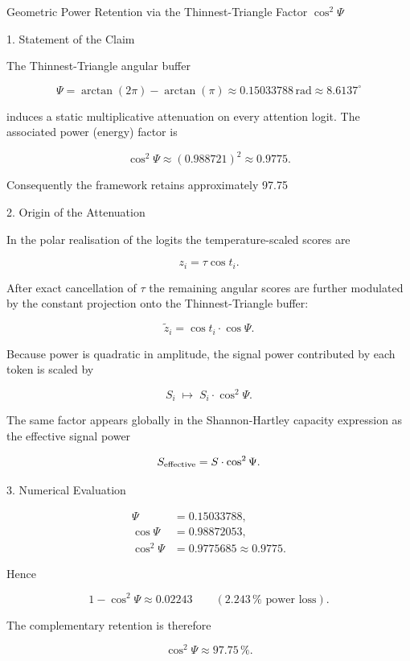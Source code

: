 Geometric Power Retention via the Thinnest-Triangle Factor \(\cos^2\Psi\)

1. Statement of the Claim

The Thinnest-Triangle angular buffer

\[
\Psi=\arctan(2\pi)-\arctan(\pi)\approx0.15033788\,\text{rad}\approx8.6137^\circ
\]

induces a static multiplicative attenuation on every attention logit. The associated power (energy) factor is

\[
\cos^2\Psi\approx(0.988721)^2\approx0.9775.
\]

Consequently the framework retains approximately 97.75 %

2. Origin of the Attenuation

In the polar realisation of the logits the temperature-scaled scores are

\[
z_i=\tau\cos t_i.
\]

After exact cancellation of \(\tau\) the remaining angular scores are further modulated by the constant projection onto the Thinnest-Triangle buffer:

\[
\tilde{z}_i=\cos t_i\cdot\cos\Psi.
\]

Because power is quadratic in amplitude, the signal power contributed by each token is scaled by

\[
S_i\;\longmapsto\;S_i\cdot\cos^2\Psi.
\]

The same factor appears globally in the Shannon-Hartley capacity expression as the effective signal power

\[
S_{\rm effective}=S\cdot\cos^2\Psi.
\]

3. Numerical Evaluation

\[
\begin{align*}
\Psi&=0.15033788,\\
\cos\Psi&=0.98872053,\\
\cos^2\Psi&=0.9775685\approx0.9775.
\end{align*}
\]

Hence

\[
1-\cos^2\Psi\approx0.02243\qquad(2.243\,\%\text{ power loss}).
\]

The complementary retention is therefore

\[
\cos^2\Psi\approx97.75\,\%.
\]


